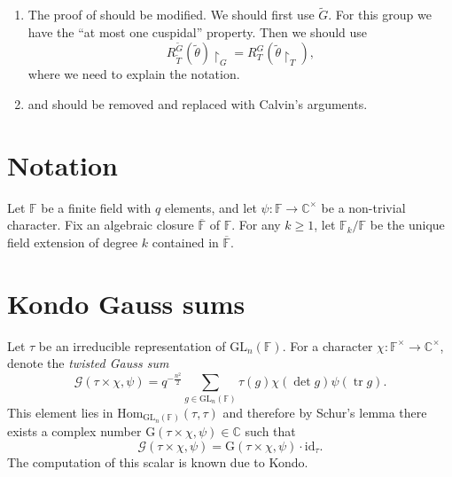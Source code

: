 \documentclass[12pt, reqno]{amsart}
\theoremstyle{definition}
\theoremstyle{definition}
\theoremstyle{definition}
\newcommand{\cComplex}{\mathbb{C}}
\newcommand{\multiplicativegroup}[1]{#1^{\times}}
\newcommand{\Hom}{\mathrm{Hom}}
\newcommand{\idmap}{\mathrm{id}}
\newcommand{\fieldCharacter}{\psi}
\newcommand{\trace}{\operatorname{tr}}
\newcommand{\GL}{\mathrm{GL}}
\newcommand{\GroupExtension}[1]{\widetilde{#1}}
\newcommand{\finiteField}{\mathbb{F}}
\newcommand{\finiteFieldExtension}[1]{\finiteField_{#1}}
\newcommand{\algebraicClosure}[1]{\overline{#1}}
\newcommand{\GaussSum}[2]{\mathcal{G}\left(#1, #2\right)}
\newcommand{\GaussSumScalar}[2]{\mathrm{G}\left(#1, #2\right)}
\begin{document}
\begin{enumerate}
	\item The proof of  should be modified. We should first use $\GroupExtension{G}$. For this group we have the ``at most one cuspidal'' property. Then we should use \cite[Page 140]{DigneMichel2020} $$R_{\GroupExtension{T}}^{\GroupExtension{G}}\left(\tilde{\theta}\right) \restriction_{G} = R_{T}^G \left(\tilde{\theta}\restriction_{T}\right),$$
	where we need to explain the notation.
	\item {} and  should be removed and replaced with Calvin's arguments.
\end{enumerate}

\section{Notation}
Let $\finiteField$ be a finite field with $q$ elements, and let $\fieldCharacter \colon \finiteField \to \multiplicativegroup{\cComplex}$ be a non-trivial character. Fix an algebraic closure $\algebraicClosure{\finiteField}$ of $\finiteField$. For any $k \ge 1$, let $\finiteFieldExtension{k} \slash \finiteField$ be the unique field extension of degree $k$ contained in $\algebraicClosure{\finiteField}$.

\section{Kondo Gauss sums}
Let $\tau$ be an irreducible representation of $\GL_n\left(\finiteField\right)$. 
For a character $\chi \colon \multiplicativegroup{\finiteField} \to \multiplicativegroup{\cComplex}$, denote the \emph{twisted Gauss sum}
$$\GaussSum{\tau \times \chi}{\fieldCharacter} = q^{-\frac{n^2}{2}} \sum_{g \in \GL_n\left(\finiteField\right)} \tau\left(g\right) \chi\left(\det g\right) \fieldCharacter\left(\trace g\right).$$
This element lies in $\Hom_{\GL_n\left(\finiteField\right)}\left(\tau, \tau\right)$ and therefore by Schur's lemma there exists a complex number $\GaussSumScalar{\tau \times \chi}{\fieldCharacter} \in \cComplex$ such that
$$\GaussSum{\tau \times \chi}{\fieldCharacter} = \GaussSumScalar{\tau \times \chi}{\fieldCharacter} \cdot \idmap_\tau.$$ The computation of this scalar is known due to Kondo.
\end{document}
